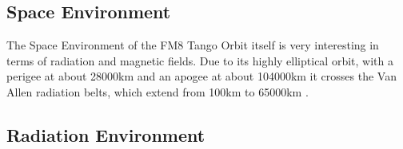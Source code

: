 \subsection{Space Environment}
The Space Environment of the FM8 Tango Orbit itself is very interesting in terms of radiation and magnetic fields. Due to its highly elliptical orbit, with a perigee at about 28000km and an apogee at about 104000km it crosses the Van Allen radiation belts, which extend from 100km to 65000km \citep{ecss:10-04C}.



\subsection{Radiation Environment}

